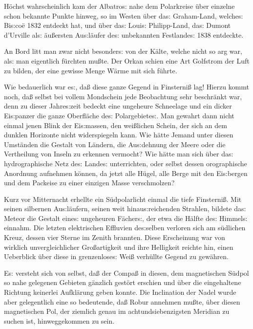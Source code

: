 \documentclass[oneside,12pt]{book}
\newcommand{\s}{s:}
\begin{document}
H\"ochst wahrscheinlich kam der {\glqq}Albatro{\s}{\grqq} nahe dem
Polarkreise \"uber einzelne schon bekannte Punkte hinweg, so im
Westen \"uber da{\s} Graham-Land, welche{\s} Bi{\s}co\"e 1832
entdeckt hat, und \"uber da{\s} Loui{\s} Philipp-Land, da{\s} Dumont
d'Urville al{\s} \"au{\ss}ersten Au{\s}l\"aufer de{\s} unbekannten
Festlande{\s} 1838 entdeckte.

An Bord litt man zwar nicht besonder{\s} von der K\"alte, welche
nicht so arg war, al{\s} man eigentlich f\"urchten mu{\ss}te. Der
Orkan schien eine Art Golfstrom der Luft zu bilden, der eine gewisse
Menge W\"arme mit sich f\"uhrte.

Wie bedauerlich war e{\s}, da{\ss} diese ganze Gegend in
Finsterni{\ss} lag! Hierzu kommt noch, da{\ss} selbst bei vollem
Mondschein jede Beobachtung sehr beschr\"ankt war, denn zu dieser
Jahre{\s}zeit bedeckt eine ungeheure Schneelage und ein dicker
Ei{\s}panzer die ganze Oberfl\"ache de{\s} Polargebiete{\s}. Man
gewahrt dann nicht einmal jenen {\glqq}Blink{\grqq} der Ei{\s}massen,
den wei{\ss}lichen Schein, der sich an dem dunklen Horizonte nicht
widerspiegeln kann. Wie h\"atte Jemand unter diesen Umst\"anden die
Gestalt von L\"andern, die Au{\s}dehnung der Meere oder die
Vertheilung von Inseln zu erkennen vermocht? Wie h\"atte man sich
\"uber da{\s} hydrographische Netz de{\s} Lande{\s} unterrichten,
oder selbst dessen orographische Anordnung aufnehmen k\"onnen, da
jetzt alle H\"ugel, alle Berge mit den Ei{\s}bergen und dem Packeise
zu einer einzigen Masse verschmolzen?

Kurz vor Mitternacht erhellte ein S\"udpolarlicht einmal die tiefe
Finsterni{\ss}. Mit seinen silbernen Au{\s}l\"aufern, seinen weit
hinau{\s}reichenden Strahlen, bildete da{\s} Meteor die Gestalt
eine{\s} ungeheuren F\"acher{\s}, der etwa die H\"alfte de{\s}
Himmel{\s} einnahm. Die letzten elektrischen Effluvien de{\s}selben
verloren sich am s\"udlichen Kreuz, dessen vier Sterne im Zenith
brannten. Diese Erscheinung war von wirklich unvergleichlicher
Gro{\ss}artigkeit und ihre Helligkeit reichte hin, einen Ueberblick
\"uber diese in grenzenlose{\s} Wei{\ss} verh\"ullte Gegend zu
gew\"ahren.

E{\s} versteht sich von selbst, da{\ss} der Compa{\ss} in diesen, dem
magnetischen S\"udpol so nahe gelegenen Gebieten g\"anzlich gest\"ort
erschien und \"uber die eingehaltene Richtung keinerlei Aufkl\"arung
geben konnte. Die Inclination der Nadel wurde aber gelegentlich eine
so bedeutende, da{\ss} Robur annehmen mu{\ss}te, \"uber diesen
magnetischen Pol, der ziemlich genau im achtundsiebenzigsten Meridian
zu suchen ist, hinweggekommen zu sein.
\end{document}
